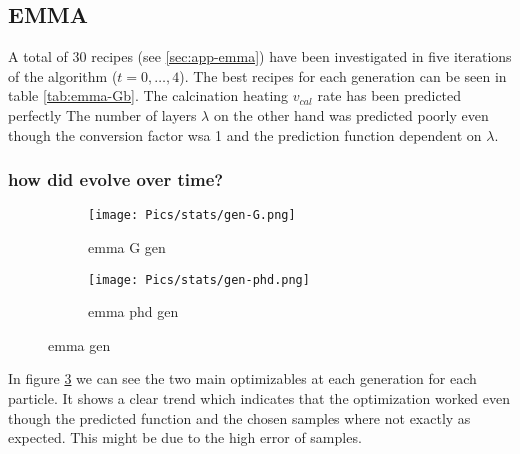 \subsection{EMMA}

A total of 30 recipes (see \ref{sec:app-emma}) have been investigated in 
five iterations of the algorithm ($t = 0, \dots, 4$). 
The best recipes for each generation can be seen in table \ref{tab:emma-Gb}. 
The calcination heating $v_{cal}$ rate has been predicted perfectly 
The number of layers $\lambda$ on the other hand was predicted poorly 
even though the conversion factor wsa 1 and the prediction function dependent on $\lambda$. 

\subsubsection{how did evolve over time?}

\begin{figure}[htb]
    \centering
    \begin{subfigure}{.45\textwidth}
        \centering
        \texttt{[image: Pics/stats/gen-G.png]}
        \caption{emma G gen } \label{fig:emma-G-gen}
    \end{subfigure}
    \begin{subfigure}{.45\textwidth}
        \centering
        \texttt{[image: Pics/stats/gen-phd.png]}
        \caption{emma phd gen} \label{fig:emma-phd-gen}
    \end{subfigure}
    \caption{emma gen} \label{fig:emma-gen}
\end{figure}

In figure \ref{fig:emma-gen} we can see the two main optimizables at each generation
for each particle.
It shows a clear trend which indicates that the optimization worked even though 
the predicted function and the chosen samples where not exactly as expected. 
This might be due to the high error of samples. 


